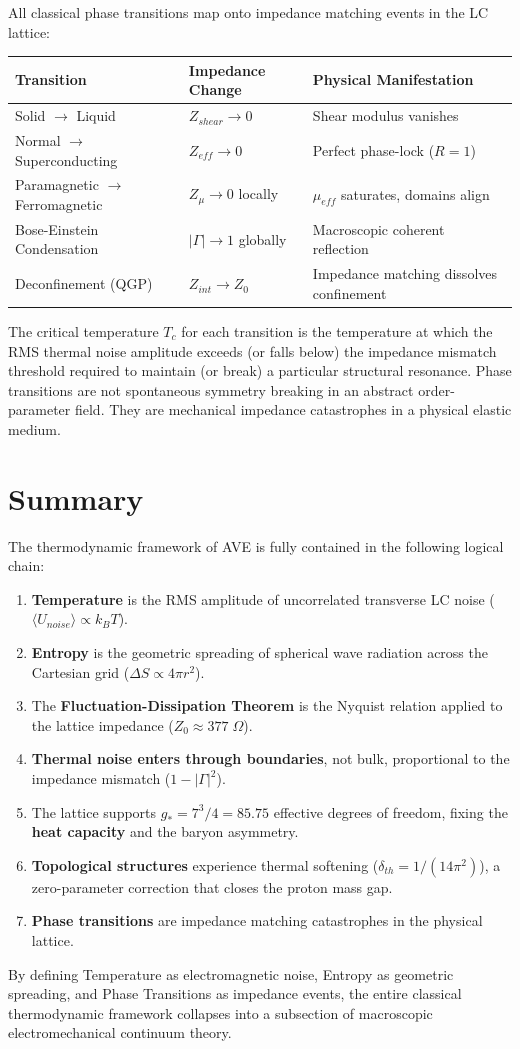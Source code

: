 All classical phase transitions map onto impedance matching events in the LC lattice:

\begin{center}
\renewcommand{\arraystretch}{1.3}
\begin{tabular}{l l l}
\toprule
\textbf{Transition} & \textbf{Impedance Change} & \textbf{Physical Manifestation} \\
\midrule
Solid $\to$ Liquid & $Z_{shear} \to 0$ & Shear modulus vanishes \\
Normal $\to$ Superconducting & $Z_{eff} \to 0$ & Perfect phase-lock ($R = 1$) \\
Paramagnetic $\to$ Ferromagnetic & $Z_\mu \to 0$ locally & $\mu_{eff}$ saturates, domains align \\
Bose-Einstein Condensation & $|\Gamma| \to 1$ globally & Macroscopic coherent reflection \\
Deconfinement (QGP) & $Z_{int} \to Z_0$ & Impedance matching dissolves confinement \\
\bottomrule
\end{tabular}
\end{center}

The critical temperature $T_c$ for each transition is the temperature at which the RMS thermal noise amplitude exceeds (or falls below) the impedance mismatch threshold required to maintain (or break) a particular structural resonance. Phase transitions are not spontaneous symmetry breaking in an abstract order-parameter field. They are mechanical impedance catastrophes in a physical elastic medium.

\section{Summary}

The thermodynamic framework of AVE is fully contained in the following logical chain:

\begin{enumerate}
    \item \textbf{Temperature} is the RMS amplitude of uncorrelated transverse LC noise ($\langle U_{noise} \rangle \propto k_B T$).
    \item \textbf{Entropy} is the geometric spreading of spherical wave radiation across the Cartesian grid ($\Delta S \propto 4\pi r^2$).
    \item The \textbf{Fluctuation-Dissipation Theorem} is the Nyquist relation applied to the lattice impedance ($Z_0 \approx 377\;\Omega$).
    \item \textbf{Thermal noise enters through boundaries}, not bulk, proportional to the impedance mismatch ($1 - |\Gamma|^2$).
    \item The lattice supports $g_* = 7^3/4 = 85.75$ effective degrees of freedom, fixing the \textbf{heat capacity} and the baryon asymmetry.
    \item \textbf{Topological structures} experience thermal softening ($\delta_{th} = 1/(14\pi^2)$), a zero-parameter correction that closes the proton mass gap.
    \item \textbf{Phase transitions} are impedance matching catastrophes in the physical lattice.
\end{enumerate}

By defining Temperature as electromagnetic noise, Entropy as geometric spreading, and Phase Transitions as impedance events, the entire classical thermodynamic framework collapses into a subsection of macroscopic electromechanical continuum theory.
